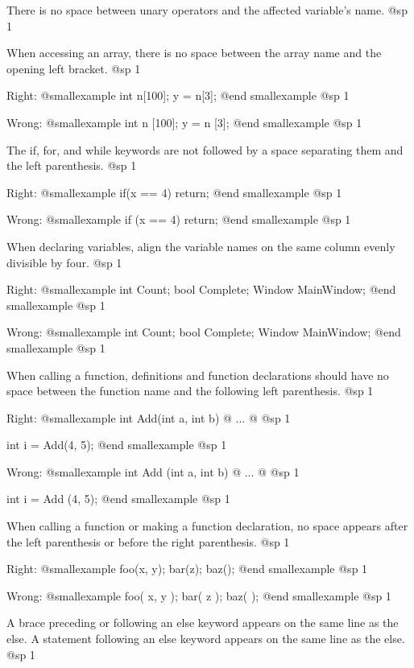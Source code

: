 \item
There is no space between unary operators and the affected variable's name.
@sp 1

\item
When accessing an array, there is no space between the array name and the opening left bracket. 
@sp 1

Right:
@smallexample
int n[100];
y = n[3];
@end smallexample
@sp 1

Wrong:
@smallexample
int n [100];
y = n [3];
@end smallexample
@sp 1

\item
The if, for, and while keywords are not followed by a space separating them and the left parenthesis. 
@sp 1

Right:
@smallexample
if(x == 4)
    return;
@end smallexample
@sp 1

Wrong:
@smallexample
if (x == 4)
    return;
@end smallexample
@sp 1

\item
When declaring variables, align the variable names on the same column evenly divisible by four.
@sp 1

Right:
@smallexample
int     Count;
bool    Complete;
Window  MainWindow;
@end smallexample
@sp 1

Wrong:
@smallexample
int Count;
bool Complete;
Window MainWindow;
@end smallexample
@sp 1

\item
When calling a function, definitions and function declarations should have no space between the function name and the following left parenthesis.
@sp 1

Right:
@smallexample
int Add(int a, int b)
@{ 
    ... 
@}
@sp 1

int i = Add(4, 5);
@end smallexample
@sp 1

Wrong:
@smallexample
int Add (int a, int b)
@{
    ...
@}
@sp 1

int i = Add (4, 5);
@end smallexample
@sp 1

\item
When calling a function or making a function declaration, no space appears after the left parenthesis or before the right parenthesis.
@sp 1

Right:
@smallexample
foo(x, y);
bar(z);
baz();
@end smallexample
@sp 1

Wrong:
@smallexample
foo( x, y );
bar( z );
baz( );
@end smallexample
@sp 1

\item
A brace preceding or following an else keyword appears on the same line as the else. A statement following an else keyword appears on the same line as the else. 
@sp 1

